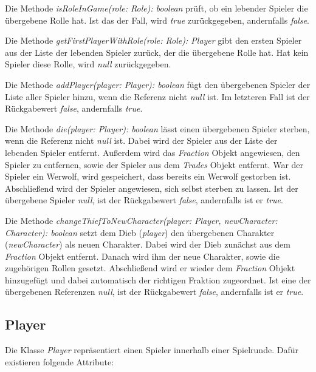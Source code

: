 \medskip
Die Methode \textit{isRoleInGame(role: Role): boolean} prüft, ob ein lebender Spieler die übergebene Rolle hat. Ist das der Fall, wird \textit{true} zurückgegeben, andernfalls \textit{false}. 

\medskip
Die Methode \textit{getFirstPlayerWithRole(role: Role): Player} gibt den ersten Spieler aus der Liste der lebenden Spieler zurück, der die übergebene Rolle hat. Hat kein Spieler diese Rolle, wird \textit{null} zurückgegeben. 

\medskip
Die Methode \textit{addPlayer(player: Player): boolean} fügt den übergebenen Spieler der Liste aller Spieler hinzu, wenn die Referenz nicht \textit{null} ist. Im letzteren Fall ist der Rückgabewert \textit{false}, andernfalls \textit{true}. 

\medskip
Die Methode \textit{die(player: Player): boolean} lässt einen übergebenen Spieler sterben, wenn die Referenz nicht \textit{null} ist. Dabei wird der Spieler aus der Liste der lebenden Spieler entfernt. Außerdem wird das \textit{Fraction} Objekt angewiesen, den Spieler zu entfernen, sowie der Spieler aus dem \textit{Trades} Objekt entfernt. War der Spieler ein Werwolf, wird gespeichert, dass bereits ein Werwolf gestorben ist. Abschließend wird der Spieler angewiesen, sich selbst sterben zu lassen. Ist der übergebene Spieler \textit{null}, ist der Rückgabewert \textit{false}, andernfalls ist er \textit{true}. 

\medskip
Die Methode \textit{changeThiefToNewCharacter(player: Player, newCharacter: Character): boolean} setzt dem Dieb (\textit{player}) den übergebenen Charakter (\textit{newCharacter}) als neuen Charakter. 
Dabei wird der Dieb zunächst aus dem \textit{Fraction} Objekt entfernt. Danach wird ihm der neue Charakter, sowie die zugehörigen Rollen gesetzt. Abschließend wird er wieder dem \textit{Fraction} Objekt hinzugefügt und dabei automatisch der richtigen Fraktion zugeordnet. Ist eine der übergebenen Referenzen \textit{null}, ist der Rückgabewert \textit{false}, andernfalls ist er \textit{true}.  

\subsection{Player}

Die Klasse \textit{Player} repräsentiert einen Spieler innerhalb einer Spielrunde. Dafür existieren folgende Attribute: 

\medskip
\begin{center}
	\begin{minipage}{0.7\textwidth}
		
	\end{minipage}
\end{center}

